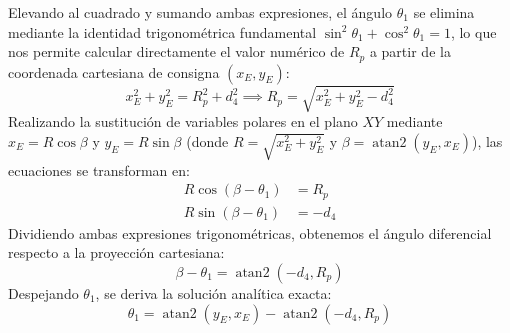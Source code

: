 \documentclass[conference,a4paper]{IEEEtran}
\begin{document}
Elevando al cuadrado y sumando ambas expresiones, el ángulo $\theta_1$ se elimina mediante la identidad trigonométrica fundamental $\sin^2\theta_1 + \cos^2\theta_1 = 1$, lo que nos permite calcular directamente el valor numérico de $R_p$ a partir de la coordenada cartesiana de consigna $(x_E, y_E)$:
\begin{equation}
x_E^2 + y_E^2 = R_p^2 + d_4^2 \implies R_p = \sqrt{x_E^2 + y_E^2 - d_4^2}
\label{eq:ik_rp}
\end{equation}
Realizando la sustitución de variables polares en el plano $XY$ mediante $x_E = R \cos\beta$ y $y_E = R \sin\beta$ (donde $R = \sqrt{x_E^2 + y_E^2}$ y $\beta = \operatorname{atan2}(y_E, x_E)$), las ecuaciones se transforman en:
\begin{align}
R \cos(\beta - \theta_1) &= R_p \\
R \sin(\beta - \theta_1) &= -d_4
\end{align}
Dividiendo ambas expresiones trigonométricas, obtenemos el ángulo diferencial respecto a la proyección cartesiana:
\begin{equation}
\beta - \theta_1 = \operatorname{atan2}(-d_4, R_p)
\end{equation}
Despejando $\theta_1$, se deriva la solución analítica exacta:
\begin{equation}
\theta_1 = \operatorname{atan2}(y_E, x_E) - \operatorname{atan2}(-d_4, R_p)
\label{eq:ik_theta1}
\end{equation}
\end{document}
